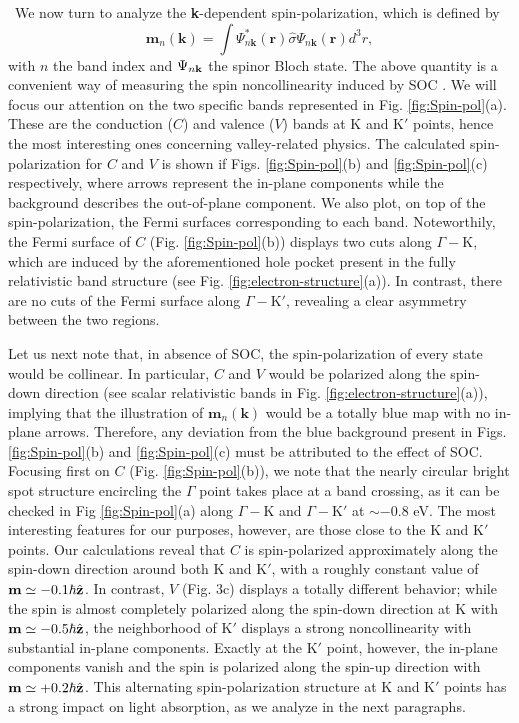 \documentclass[aps,prb,showpacs,preprintnumbers,twocolumn,amsmath,amssymb]{revtex4-1}
\begin{document}
\
 We now turn to analyze the \textbf{k}-dependent spin-polarization, which is defined by
\begin{equation}\label{eq:K-dep.Mag}
\textbf{m}_n(\textbf{k})=\int \Psi^*_{n\textbf{k}}(\textbf{r})\textbf{$\hat{\sigma}$}\Psi_{n\textbf{k}}(\textbf{r}) d^3r,
\end{equation}
with $n$ the band index and $\Psi_{n \bf k}$ the spinor Bloch state. The above quantity is a convenient way of measuring the spin noncollinearity induced by SOC \cite{Eiguren2009,Ibanez-Azpiroz2011,Liu2009}.
We will focus our attention on the two specific bands represented in Fig. \ref{fig:Spin-pol}(a). These are the conduction ($C$) and valence ($V$) bands at K and K$'$ points, hence the most interesting ones concerning valley-related physics. The calculated spin-polarization for $C$ and $V$ is shown if Figs. \ref{fig:Spin-pol}(b) and \ref{fig:Spin-pol}(c) respectively, where arrows represent the in-plane components while the background describes the out-of-plane component. We also plot, on top of the spin-polarization, the Fermi surfaces corresponding to each band.
Noteworthily, the Fermi surface of $C$ (Fig. \ref{fig:Spin-pol}(b)) displays two cuts along $\Gamma-$K, which are induced by the aforementioned hole pocket present in the fully relativistic band structure (see Fig. \ref{fig:electron-structure}(a)). In contrast, there are no cuts of the Fermi surface along $\Gamma-$K$'$, revealing a clear asymmetry between the two regions.

Let us next note that, in absence of SOC, the spin-polarization of every state would be collinear. In particular, $C$ and $V$ would be polarized along the spin-down direction (see scalar relativistic bands in Fig. \ref{fig:electron-structure}(a)), implying that the illustration of  $\textbf{m}_{n}(\textbf{k})$  would be a totally blue map with no in-plane arrows. Therefore, any deviation from the blue background present in Figs. \ref{fig:Spin-pol}(b) and \ref{fig:Spin-pol}(c) must be attributed to the effect of SOC. Focusing first on $C$ (Fig. \ref{fig:Spin-pol}(b)), we note that the nearly circular bright spot structure encircling the $\Gamma$ point takes place at a band crossing, as it can be checked in Fig \ref{fig:Spin-pol}(a) along $\Gamma-$K and $\Gamma-$K$'$ at $\sim -0.8$ eV. The most interesting features for our purposes, however, are those close to the K and K$'$ points. Our calculations reveal that $C$ is spin-polarized approximately along the spin-down direction around both K and K$'$, with a roughly constant value of $\textbf{m}\simeq -0.1 \hbar \hat{\bf z}$. In contrast, $V$ (Fig. 3c) displays a totally different behavior; while the spin is almost completely polarized along the spin-down direction at K with $\textbf{m}\simeq -0.5 \hbar \hat{\bf z}$, the neighborhood of K$'$ displays a strong noncollinearity with substantial in-plane components. Exactly at the K$'$ point, however, the in-plane components vanish and the spin is polarized along the spin-up direction with $\textbf{m}\simeq +0.2 \hbar \hat{\bf z}$. This alternating spin-polarization structure at K and K$'$ points has a strong impact on light absorption, as we analyze in the next paragraphs. 
\end{document}
